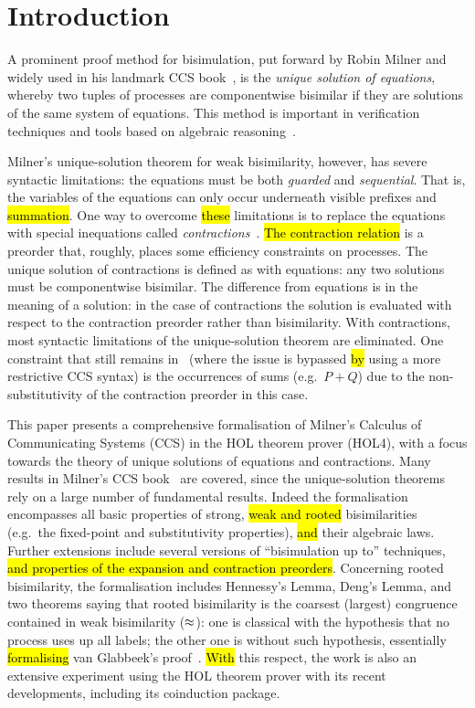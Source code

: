 \section{Introduction}

A prominent proof method for bisimulation, put forward by Robin Milner and widely used in his
landmark CCS book~\cite{Mil89}, is the
\emph{unique solution of equations}, whereby two tuples of processes are
componentwise bisimilar if they are solutions of the same system of equations.
This method is important in verification techniques and tools
based on algebraic reasoning~\cite{BaeBOOK,theoryAndPractice,RosUnder10}. 

Milner's unique-solution theorem for weak bisimilarity, however,
has severe syntactic limitations:
the equations must be both \emph{guarded} and \emph{sequential}. That is,
the variables of the equations can only occur underneath visible prefixes and \hl{summation}.
One way to overcome \hl{these} limitations is to replace the equations
with special inequations called
\emph{contractions}~\cite{sangiorgi2015equations,sangiorgi2017equations}. \hl{The
contraction relation} is a
preorder that, roughly, places some efficiency constraints on processes.
The unique solution of contractions is defined as with equations:
any two solutions must be componentwise bisimilar.
The difference from equations is in the meaning of a solution:
in the case of contractions the solution is evaluated with respect to
the contraction preorder rather than bisimilarity. 
With contractions, most syntactic limitations of the unique-solution theorem are
eliminated. One constraint that still remains
in~\cite{sangiorgi2017equations}
(where the issue is bypassed \hl{by} using a more
restrictive CCS syntax)
is the occurrences of  sums (e.g.~$P + Q$) due to
the non-substitutivity of the contraction preorder in this case.

This paper presents a comprehensive formalisation of Milner's Calculus of Communicating
Systems (CCS) in the HOL theorem prover (HOL4),
with a focus towards the theory of unique solutions of equations and contractions.
Many results in Milner's CCS book~\cite{Mil89} are covered, since
the unique-solution theorems rely on a large number of fundamental results.
Indeed the formalisation encompasses all basic properties of strong,
\hl{weak and rooted}
bisimilarities (e.g.~the fixed-point and substitutivity properties), \hl{and} their algebraic laws.
Further extensions include several versions of ``bisimulation up to''
techniques, \hl{and properties of the expansion and contraction preorders}.
Concerning rooted bisimilarity, the formalisation
includes Hennessy's Lemma, Deng's Lemma,
 and two theorems saying that rooted bisimilarity is the coarsest (largest)
 congruence contained in weak bisimilarity ($\approx$): one is classical
 with the hypothesis that no process uses up all labels;
the other one is 
without such hypothesis, essentially \hl{formalising} van Glabbeek's proof~\cite{van2005characterisation}.
\hl{With} this respect, the work is also an extensive experiment using the HOL theorem prover with its
recent developments, including its coinduction package.

